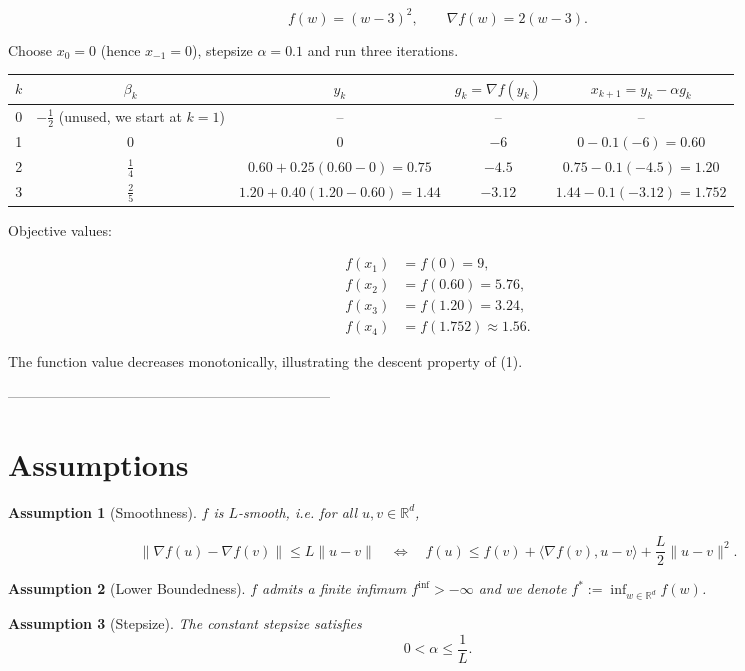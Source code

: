 \documentclass[11pt]{article}
\newtheorem{assumption}{Assumption}
\newcommand{\grad}{\nabla}
\newcommand{\R}{\mathbb{R}}
\begin{document}
\[
f(w) = (w-3)^2,\qquad \grad f(w)=2(w-3).
\]

Choose \(x_0=0\) (hence \(x_{-1}=0\)), stepsize \(\alpha=0.1\) and run three iterations.

\begin{center}
\begin{tabular}{c|c|c|c|c}
\(k\) & \(\beta_k\) & \(y_k\) & \(g_k=\grad f(y_k)\) & \(x_{k+1}=y_k-\alpha g_k\) \\ \hline
0 & \(-\frac12\) (unused, we start at \(k=1\)) & – & – & – \\
1 & \(0\) & \(0\) & \(-6\) & \(0-0.1(-6)=0.60\) \\
2 & \(\frac14\) & \(0.60+0.25(0.60-0)=0.75\) & \(-4.5\) & \(0.75-0.1(-4.5)=1.20\) \\
3 & \(\frac25\) & \(1.20+0.40(1.20-0.60)=1.44\) & \(-3.12\) & \(1.44-0.1(-3.12)=1.752\)
\end{tabular}
\end{center}

Objective values:

\[
\begin{aligned}
f(x_1)&=f(0)=9,\\
f(x_2)&=f(0.60)=5.76,\\
f(x_3)&=f(1.20)=3.24,\\
f(x_4)&=f(1.752)\approx1.56.
\end{aligned}
\]

The function value decreases monotonically, illustrating the descent property of (1).

---------------------------------------------------------------------

\section*{Assumptions}
\begin{assumption}[Smoothness]\label{as:smooth}
\(f\) is \(L\)-smooth, i.e. for all \(u,v\in\R^d\),

\[
\|\grad f(u)-\grad f(v)\| \le L\|u-v\|
\quad\Longleftrightarrow\quad
f(u) \le f(v)+\langle\grad f(v),u-v\rangle+\frac{L}{2}\|u-v\|^{2}.
\tag{2}
\]
\end{assumption}

\begin{assumption}[Lower Boundedness]\label{as:lb}
\(f\) admits a finite infimum \(f^{\inf}>-\infty\) and we denote
\(f^{*}:=\inf_{w\in\R^{d}} f(w)\).
\end{assumption}

\begin{assumption}[Stepsize]\label{as:step}
The constant stepsize satisfies 
\[
0<\alpha\le \frac{1}{L}.
\tag{3}
\]
\end{assumption}
\end{document}

